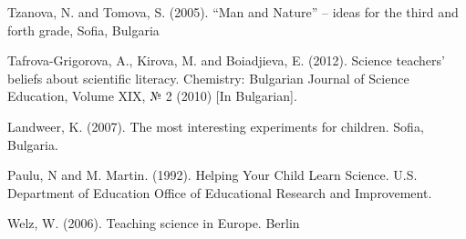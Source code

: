 \documentclass[11.5pt]{sig-alternate} %
\begin{document}
Tzanova, N. and Tomova, S. (2005). “Man and Nature” – ideas for the third and forth grade, Sofia, Bulgaria

Tafrova-Grigorova, A., Kirova, M. and Boiadjieva, E. (2012). Science teachers’ beliefs about scientific literacy. Chemistry: Bulgarian Journal of Science Education, Volume XIX, № 2 (2010) [In Bulgarian].

Landweer, K. (2007). The most interesting experiments for children. Sofia, Bulgaria.

Paulu, N and M. Martin. (1992). Helping Your Child Learn Science. U.S. Department of Education Office of Educational Research and Improvement. 

Welz, W. (2006). Teaching science in Europe. Berlin
\end{document}
